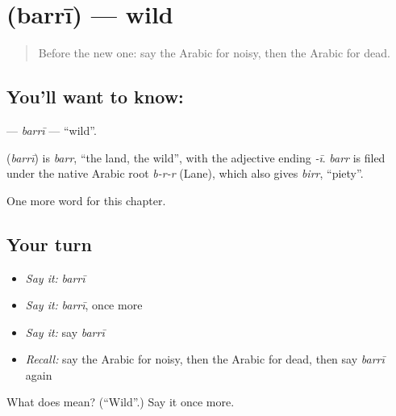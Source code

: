 \section[\texorpdfstring{\ar{بري} (barrī)}{بري (barrī)}]{ (barrī) — wild}

\label{lesson:AR-C242-barri}



\begin{quote}
Before the new one: say the Arabic for noisy, then the Arabic for dead.
\end{quote}

\subsection*{You'll want to know: }
\textbf{} — \emph{barrī} — \textquotedblleft{}wild\textquotedblright{}.

\begin{cousinweb}
\textbf{} (\emph{barrī}) is \emph{barr}, \textquotedblleft{}the land, the wild\textquotedblright{}, with the adjective ending \emph{-ī}. \emph{barr} is filed under the native Arabic root \emph{b-r-r} (Lane), which also gives \emph{birr}, \textquotedblleft{}piety\textquotedblright{}.
\end{cousinweb}

\begin{grammarlens}[title={What you've built}]
One more word for this chapter.
\end{grammarlens}

\subsection*{Your turn}
\begin{itemize}
\raggedright
  \item \emph{Say it:} \emph{barrī}
  \item \emph{Say it:} \emph{barrī}, once more
  \item \emph{Say it:} say \emph{barrī}
  \item \emph{Recall:} say the Arabic for noisy, then the Arabic for dead, then say \emph{barrī} again
\end{itemize}

\begin{tcolorbox}[breakable,colback=teal!4,colframe=teal!35!black,title={Before you move on}]
What does  mean? (\textquotedblleft{}Wild\textquotedblright{}.) Say it once more.
\end{tcolorbox}
